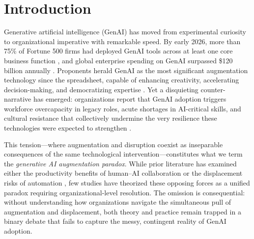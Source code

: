\documentclass[12pt, a4paper]{article}
\begin{document}
\begin{titlepage}
\begin{abstract}
\vspace{0.5cm}
\noindent\textbf{Keywords:} Generative artificial intelligence; Augmentation paradox; Dynamic capabilities; Organizational resilience; Sociotechnical systems; Workforce transformation; Human--AI complementarity
\end{abstract}

\end{titlepage}

\section{Introduction}

Generative artificial intelligence (GenAI) has moved from experimental curiosity to organizational imperative with remarkable speed. By early 2026, more than 75\% of Fortune 500 firms had deployed GenAI tools across at least one core business function \citep{McKinsey2025}, and global enterprise spending on GenAI surpassed \$120 billion annually \citep{IDC2025}. Proponents herald GenAI as the most significant augmentation technology since the spreadsheet, capable of enhancing creativity, accelerating decision-making, and democratizing expertise \citep{Brynjolfsson2023, DellAcqua2023}. Yet a disquieting counter-narrative has emerged: organizations report that GenAI adoption triggers workforce overcapacity in legacy roles, acute shortages in AI-critical skills, and cultural resistance that collectively undermine the very resilience these technologies were expected to strengthen \citep{WEF2025, BCG2025}.

This tension---where augmentation and disruption coexist as inseparable consequences of the same technological intervention---constitutes what we term the \textit{generative AI augmentation paradox}. While prior literature has examined either the productivity benefits of human--AI collaboration \citep{Raisch2025, Chowdhury2022} or the displacement risks of automation \citep{Frey2017, Acemoglu2022}, few studies have theorized these opposing forces as a unified paradox requiring organizational-level resolution. The omission is consequential: without understanding how organizations navigate the simultaneous pull of augmentation and displacement, both theory and practice remain trapped in a binary debate that fails to capture the messy, contingent reality of GenAI adoption.
\end{document}
